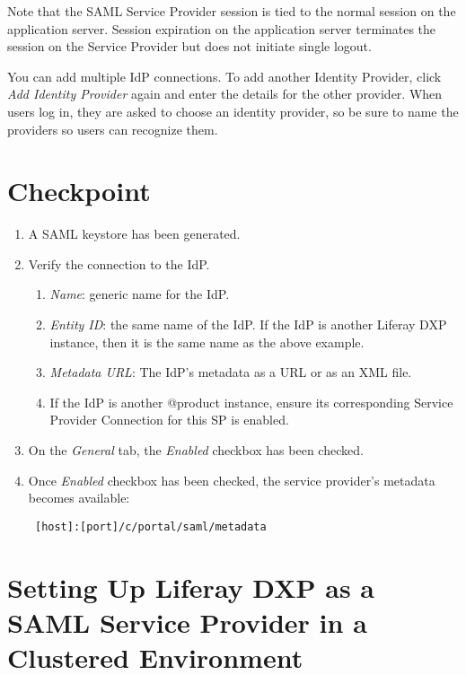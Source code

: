 Note that the SAML Service Provider session is tied to the normal
session on the application server. Session expiration on the application
server terminates the session on the Service Provider but does not
initiate single logout.

You can add multiple IdP connections. To add another Identity Provider,
click \emph{Add Identity Provider} again and enter the details for the
other provider. When users log in, they are asked to choose an identity
provider, so be sure to name the providers so users can recognize them.

\section{Checkpoint}\label{checkpoint-2}

\begin{enumerate}
\def\labelenumi{\arabic{enumi}.}
\item
  A SAML keystore has been generated.
\item
  Verify the connection to the IdP.

  \begin{enumerate}
  \def\labelenumii{\alph{enumii}.}
  \item
    \emph{Name}: generic name for the IdP.
  \item
    \emph{Entity ID}: the same name of the IdP. If the IdP is another
    Liferay DXP instance, then it is the same name as the above example.
  \item
    \emph{Metadata URL}: The IdP's metadata as a URL or as an XML file.
  \item
    If the IdP is another @product instance, ensure its corresponding
    Service Provider Connection for this SP is enabled.
  \end{enumerate}
\item
  On the \emph{General} tab, the \emph{Enabled} checkbox has been
  checked.
\item
  Once \emph{Enabled} checkbox has been checked, the service provider's
  metadata becomes available:

\begin{verbatim}
 [host]:[port]/c/portal/saml/metadata
\end{verbatim}
\end{enumerate}

\section{Setting Up Liferay DXP as a SAML Service Provider in a
Clustered
Environment}\label{setting-up-liferay-dxp-as-a-saml-service-provider-in-a-clustered-environment}

